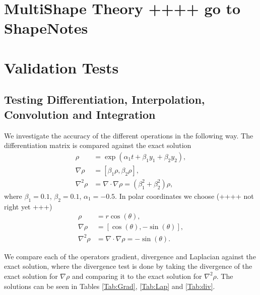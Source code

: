 \documentclass[11pt, a4paper]{article}
\theoremstyle{definition}
\begin{document}
\section*{MultiShape Theory ++++ go to ShapeNotes}

\section{Validation Tests}


\subsection{Testing Differentiation, Interpolation, Convolution and Integration}
We investigate the accuracy of the different operations in the following way.
The differentiation matrix is compared against the exact solution
\begin{align*}
	\rho &= \exp( \alpha_1  t + \beta_1 y_1 + \beta_2 y_2),\\
	\nabla \rho &= [\beta_1 \rho, \beta_2 \rho],\\
	\nabla^2 \rho &= \nabla \cdot \nabla \rho = (\beta_1^2 + \beta_2^2)\rho,
\end{align*}
where $	\beta_1 = 0.1 $, $\beta_2 = 0.1$, $\alpha_1 = -0.5$.
In polar coordinates we choose (++++ not right yet +++)
\begin{align*}
	\rho & = r \cos(\theta),\\
	\nabla \rho &= [\cos (\theta), -\sin (\theta)],\\
	\nabla^2 \rho & = \nabla \cdot \nabla \rho = - \sin( \theta).
\end{align*}

We compare each of the operators gradient, divergence and Laplacian against the exact solution, where the divergence test is done by taking the divergence of the exact solution for $\nabla \rho$ and comparing it to the exact solution for $\nabla^2 \rho$. The solutions can be seen in Tables \ref{Tab:Grad}, \ref{Tab:Lap} and \ref{Tab:div}.
\end{document}
